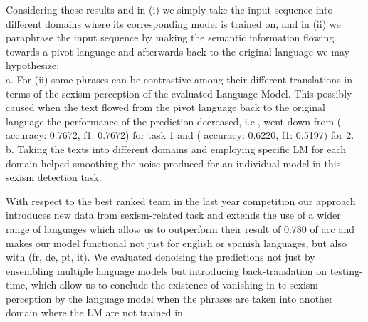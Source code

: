 \documentclass[11pt]{article}
\begin{document}
	Considering these results and in (i) we simply take the input sequence into different domains where its corresponding model is trained on, and in (ii) we paraphrase the input sequence by making the semantic information flowing towards a pivot language and afterwards back to the original language we may hypothesize:
	\\
	
	a. For (ii) some phrases can be contrastive among their different translations in terms of the sexism perception of the evaluated Language Model. This possibly caused when the text flowed from the pivot language back to the original language the performance of the prediction decreased, i.e., went down from ( accuracy: 0.7672, f1: 0.7672) for task 1 and  ( accuracy: 0.6220, f1: 0.5197) for 2.	
	\\
	
	b. Taking the texts into different domains and employing specific LM for each domain helped smoothing the noise produced for an individual model in this sexism detection task.
	
	With respect to the best ranked team in the last year competition our approach introduces new data from sexism-related task and extends the use of a wider range of languages which allow us to outperform their result of 0.780 of acc and makes our model functional not just for english or spanish languages, but also with  (fr, de, pt, it). We evaluated denoising the predictions not just by ensembling multiple language models but introducing back-translation on testing-time, which allow us to conclude the existence of vanishing in te sexism perception by the language model when the phrases are taken into another domain where the LM are not trained in.

	
\end{document}

